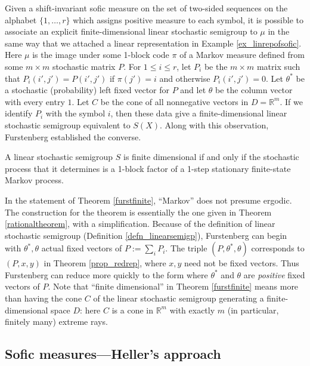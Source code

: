 \documentclass{kepart2010}
\theoremstyle{plain}
\theoremstyle{definition}
\theoremstyle{remark}
\theoremstyle{definition}
\numberwithin{equation}{section}
\begin{document}
Given a shift-invariant sofic measure on the set of two-sided
sequences on the alphabet $\{1, \dots,r\}$ which assigns positive
measure to each symbol,
 it is
possible to associate an explicit finite-dimensional linear
stochastic semigroup to
 $\mu$
  in the same way that we attached a linear representation in Example
 \ref{ex_linrepofsofic}.
  Here $\mu$ is
the image under some 1-block code $\pi$ of a Markov measure defined
from some $m\times m$  stochastic matrix $P$. For $1\leq i \leq r$,
let $P_i$ be the $m\times m$ matrix  such that $P_i(i',j') =
P(i',j')$ if $\pi (j')=i$ and otherwise $P_i(i',j') = 0$. Let
$\theta^* $ be a stochastic (probability) left fixed vector for
$P$ and let $\theta $ be the column vector with every entry $1$.
Let $C$ be the cone of all nonnegative vectors in $D= \mathbb R^m$.
If we identify $P_i$ with the symbol $i$, then these data give a
finite-dimensional linear stochastic semigroup equivalent to $S(X)$.
Along with this observation, Furstenberg established the converse.

 \begin{thm}\label{furstfinite}
 \cite[Theorem 19.2]{Furstenberg1960}
  A linear stochastic semigroup $S$ is
finite dimensional if and only if the stochastic process that it
determines is a 1-block factor of a 1-step stationary finite-state
Markov process.
\end{thm}
In the statement of Theorem \ref{furstfinite}, ``Markov'' does not
presume ergodic. The construction for the theorem is essentially the
one given in Theorem \ref{rationaltheorem},
with a simplification. Because of the definition of linear
stochastic semigroup (Definition \ref{defn_linearsemigp}),
Furstenberg can begin with $\theta^*, \theta$ actual  fixed vectors
of $P:= \sum_i P_i$. The triple $(P ,\theta^*, \theta )$ corresponds
to $(P,x,y)$ in Theorem \ref{prop_redrep}, where $x,y$ need not be
fixed vectors. Thus Furstenberg can reduce more quickly to the form
where $\theta^*$ and $ \theta $ are {\em positive} fixed vectors of
$P$. Note that ``finite dimensional'' in Theorem \ref{furstfinite}
means more than having the cone $C$ of the linear stochastic
semigroup generating a finite-dimensional space $D$: here $C$ is a
cone in $\mathbb R^m$ with exactly $m$ (in particular, finitely
many) extreme rays.

\subsection{Sofic measures---Heller's approach}
\end{document}
